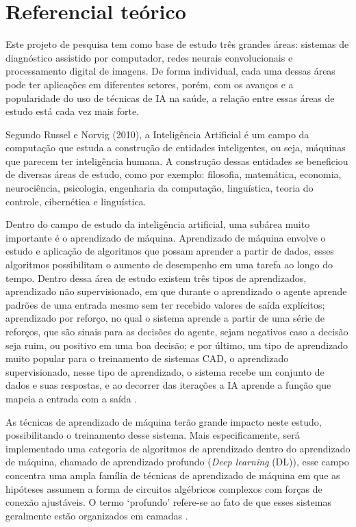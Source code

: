 \section{Referencial teórico}

Este projeto de pesquisa tem como base de estudo três grandes áreas: sistemas de diagnóstico assistido por computador, redes neurais convolucionais e processamento digital de imagens. De forma individual, cada uma dessas áreas pode ter aplicações em diferentes setores, porém, com os avanços e a popularidade do uso de técnicas de \acs{IA} na saúde, a relação entre essas áreas de estudo está cada vez mais forte.


Segundo Russel e Norvig (2010), a Inteligência Artificial  é um campo da computação que estuda a construção de entidades inteligentes, ou seja, máquinas que parecem ter inteligência humana. A construção dessas entidades se beneficiou de diversas áreas de estudo, como por exemplo: filosofia, matemática, economia, neurociência, psicologia, engenharia da computação, linguística, teoria do controle, cibernética e linguística.


  Dentro do campo de estudo da inteligência artificial, uma subárea muito importante é o aprendizado de máquina. Aprendizado de máquina envolve o estudo e aplicação de algoritmos que possam aprender a partir de dados, esses algoritmos possibilitam o aumento de desempenho em uma tarefa ao longo do tempo. Dentro dessa área de estudo existem três tipos de aprendizados, aprendizado não supervisionado, em que durante o aprendizado o agente aprende padrões de uma entrada mesmo sem ter recebido valores de saída explícitos; aprendizado por reforço, no qual o sistema aprende a partir de uma série de reforços, que são sinais para as decisões do agente, sejam negativos caso a decisão seja ruim, ou positivo em uma boa decisão; e por último, um tipo de aprendizado muito popular para o treinamento de sistemas CAD, o aprendizado supervisionado, nesse tipo de aprendizado, o sistema recebe um conjunto de dados e suas respostas, e ao decorrer das iterações a \acs{IA} aprende a função que mapeia a entrada com a saída \cite{haykin2009neural}.

As técnicas de aprendizado de máquina terão grande impacto neste estudo, possibilitando o treinamento desse sistema. Mais especificamente, será implementado uma categoria de algoritmos de aprendizado dentro do aprendizado de máquina, chamado de aprendizado profundo (\textit{Deep learning} (DL)), esse campo concentra uma ampla família de técnicas de aprendizado de máquina em que as hipóteses assumem a forma de circuitos algébricos complexos com forças de conexão ajustáveis. O termo ‘profundo’ refere-se ao fato de que esses sistemas geralmente estão organizados em camadas \cite{10.5555/1671238}.

